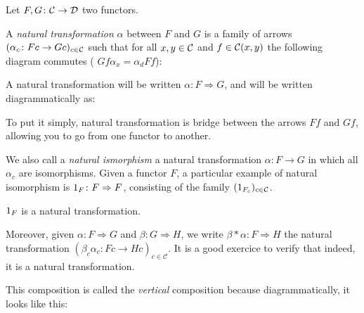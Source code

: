 \documentclass[a4paper]{article}
\theoremstyle { remark }
\theoremstyle { definition }
\newtheorem { definition } { Definition }
\theoremstyle { plain }
\begin{document}
\begin{definition}
Let \( F, G \colon  \mathcal { C }  \to  \mathcal { D }  \) two functors.

A \emph{natural transformation} \( \alpha \) between \( F \) and \( G \) is a family of arrows \( (\alpha_c \colon F c \to G c)_{c \in  \mathcal { C } } \) such that for all \( x, y \in  \mathcal { C }  \) and \( f \in  \mathcal { C } (x, y) \) the following diagram commutes (\ie{} \( G f \alpha_x = \alpha_d F f \)):

\begin{center}
\end{center}

A natural transformation will be written \( \alpha \colon F \Rightarrow G \), and will be written diagrammatically as:

\begin{center}
\end{center}

\end{definition}

To put it simply, natural transformation is bridge between the arrows $Ff$ and $Gf$, allowing you to go from one functor to another.

We also call a \emph{natural ismorphism} a natural transformation \( \alpha \colon F \to G \) in which all \( \alpha_c \) are isomorphisms.
Given a functor \( F \), a particular example of natural isomorphism is \( \one[F] \colon F \Rightarrow F \), consisting of the family \( (\one[F_c])_{c \in \C} \).

\( \one[F] \) is a natural transformation.

Moreover, given \( \alpha \colon F \Rightarrow G \) and \( \beta \colon G \Rightarrow H \), we write \( \beta * \alpha \colon F \Rightarrow H \) the natural transformation \( (\beta_c \alpha_c \colon Fc \to Hc)_{c \in \mathcal{C}} \).
It is a good exercice to verify that indeed, it is a natural transformation.

This composition is called the \emph{vertical} composition because diagrammatically, it looks like this: 
\end{document}
